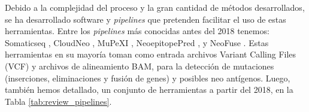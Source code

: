 Debido a la complejidad del proceso y la gran cantidad de métodos desarrollados, se ha desarrollado software y \textit{pipelines} que pretenden facilitar el uso de estas herramientas. Entre los \textit{pipelines} más conocidas antes del 2018 tenemos: Somaticseq \citep{fang2015ensemble}, CloudNeo \citep{bais2017cloudneo}, MuPeXI \citep{bjerregaard2017mupexi}, NeoepitopePred \citep{tran2015immunogenicity}, y NeoFuse \citep{gros2016prospective}. Estas herramientas en su mayoría toman como entrada archivos Variant Calling Files (VCF) y archivos de alineamiento BAM, para la detección de mutaciones (inserciones, eliminaciones y fusión de genes) y posibles neo antígenos. Luego, también hemos detallado, un conjunto de herramientas a partir del 2018, en la Tabla \ref{tab:review_pipelines}.





